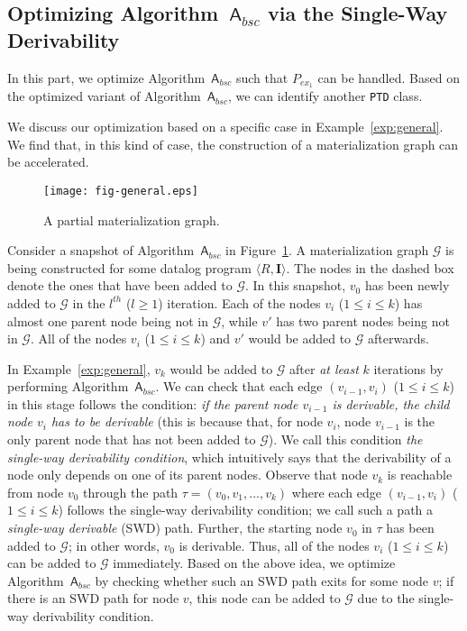 \documentclass[final,1p,times]{elsarticle}
\begin{document}
\subsection{Optimizing Algorithm~$\mathsf{A}_{bsc}$ via the Single-Way Derivability}

In this part, we optimize Algorithm~$\mathsf{A}_{bsc}$ such that $P_{ex_1}$
can be handled. Based on the optimized variant of Algorithm~$\mathsf{A}_{bsc}$,
we can identify another \texttt{PTD} class.

We discuss our optimization based on a specific case in Example~\ref{exp:general}.
We find that, in this kind of case, the construction of a materialization graph can be accelerated.

\begin{figure}[htbp]
\begin{center}
\texttt{[image: fig-general.eps]}
\caption{A partial materialization graph.}
\label{fig:general}
\end{center}
\end{figure}

\begin{example}\label{exp:general}
Consider a snapshot of Algorithm~$\mathsf{A}_{bsc}$ in
Figure~\ref{fig:general}. A materialization graph $\mathcal{G}$
is being constructed for some datalog program $\langle R, \textbf{I}\rangle$.
The nodes in the dashed box denote the ones that have been added to $\mathcal{G}$.
In this snapshot, $v_0$ has been newly added
to $\mathcal{G}$ in the $l^{th}$ ($l\geq 1$) iteration.
Each of the nodes $v_i$ ($1\leq i\leq k$) has almost one parent node being not in $\mathcal{G}$,
while $v'$ has two parent nodes being not in $\mathcal{G}$.
All of the nodes $v_i$ ($1\leq i\leq k$) and $v'$ would be added to $\mathcal{G}$
afterwards.
\end{example}


In Example~\ref{exp:general}, $v_k$ would be added to $\mathcal{G}$ after \emph{at least} $k$
iterations by performing Algorithm~$\mathsf{A}_{bsc}$.
We can check that each edge $(v_{i-1},v_i)$ ($1\leq i\leq k$) in this stage follows the condition:
\emph{if the parent node $v_{i-1}$ is derivable, the child node $v_i$ has to be derivable} (this
is because that, for node $v_i$, node $v_{i-1}$ is the only parent node that has not been added to $\mathcal{G}$).
We call this condition \emph{the single-way derivability condition}, which intuitively says that the derivability of a
node only depends on one of its parent nodes.
Observe that node $v_k$ is reachable from node $v_0$ through the path $\tau=(v_0,v_1,...,v_k)$ where
each edge $(v_{i-1},v_i)$ ($1\leq i\leq k$) follows the single-way derivability condition;
we call such a path a \emph{single-way derivable} (SWD) path.
Further, the starting node $v_0$ in $\tau$ has been added to $\mathcal{G}$; in other words,
$v_0$ is derivable. Thus, all of the nodes $v_i$ ($1\leq i\leq k$) can be added to
$\mathcal{G}$ immediately.
Based on the above idea, we optimize Algorithm~$\mathsf{A}_{bsc}$ by checking whether such an SWD path
exits for some node $v$; if there is an SWD path for node $v$, this node can be added to $\mathcal{G}$
due to the single-way derivability condition.
\end{document}
